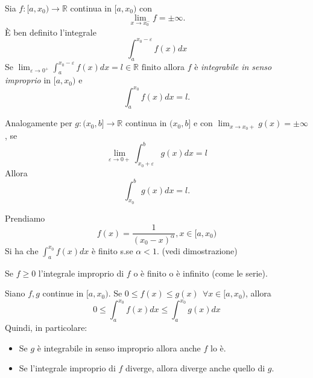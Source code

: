 \begin{definizione}
    Sia $f: [a, x_0) \to \mathbb{R}$ continua in $[a, x_0)$ con
    \begin{equation*}
    \lim_{x\to x_0^-}f = \pm\infty.
    \end{equation*}
    È ben definito l'integrale
    \begin{equation*}
        \int_{a}^{x_0 - \varepsilon} f(x) dx
    \end{equation*}
    Se $\lim_{\varepsilon\to 0^+}\int_{a}^{x_0 - \varepsilon} f(x) dx = l\in \mathbb{R} \text{ finito}$ allora $f$ è \textit{integrabile in senso improprio} in $[a, x_0)$ e
    \begin{equation}
        \int_{a}^{x_0} f(x) dx = l.
    \end{equation}
\end{definizione}

\begin{corollario}
    Analogamente per $g: (x_0, b] \to \mathbb{R}$ continua in $(x_0, b]$ e con $\lim_{x\to x_0+}g(x) =\pm\infty$, se
    \begin{equation}
        \lim_{\varepsilon\to 0+}\int_{x_0+\varepsilon}^{b} g(x) dx= l
    \end{equation}
    Allora
    \begin{equation}
        \int_{x_0}^{b} g(x) dx = l.
    \end{equation}
\end{corollario}

\begin{esempio}
    Prendiamo
    \begin{equation}
        f(x) = \frac{1}{(x_0-x)^\alpha}, x\in[a,x_0)
    \end{equation}
    Si ha che $\int_{a}^{x_0} f(x) dx$ è finito s.se $\alpha < 1$. (vedi dimostrazione)
\end{esempio}

\begin{osservazione}
    Se $f \geq 0$ l'integrale improprio di $f$ o è finito o è infinito (come le serie).
\end{osservazione}

\begin{proprieta}
    Siano $f,g$ continue in $[a, x_0)$. Se $0\leq f(x)\leq g(x)\ \ \forall x\in [a, x_0)$, allora
    \begin{equation}
        0 \leq \int_{a}^{x_0} f(x) dx \leq \int_{a}^{x_0} g(x) dx
    \end{equation}
    Quindi, in particolare:
    \begin{itemize}
        \item Se $g$ è integrabile in senso improprio allora anche $f$ lo è.
        \item Se l'integrale improprio di $f$ diverge, allora diverge anche quello di $g$.
    \end{itemize}
\end{proprieta}

